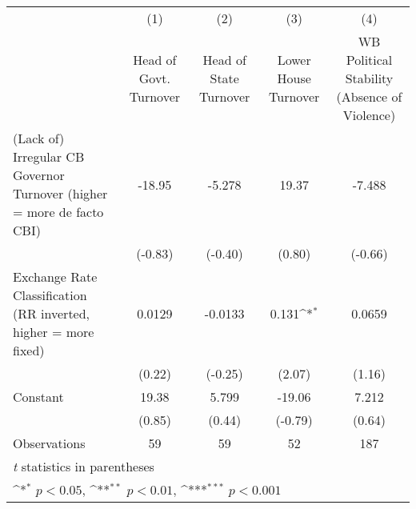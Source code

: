 {
\def\sym#1{\ifmmode^{#1}\else\(^{#1}\)\fi}
\begin{tabular*}{\linewidth}{@{\hskip\tabcolsep\extracolsep\fill}l*{4}{c}}
\hline\hline
                &\multicolumn{1}{c}{(1)}&\multicolumn{1}{c}{(2)}&\multicolumn{1}{c}{(3)}&\multicolumn{1}{c}{(4)}\\
                &\multicolumn{1}{c}{Head of Govt. Turnover}&\multicolumn{1}{c}{Head of State Turnover}&\multicolumn{1}{c}{Lower House Turnover}&\multicolumn{1}{c}{WB Political Stability (Absence of Violence)}\\
\hline
(Lack of) Irregular CB Governor Turnover (higher = more de facto CBI)&   -18.95         &   -5.278         &    19.37         &   -7.488         \\
                &  (-0.83)         &  (-0.40)         &   (0.80)         &  (-0.66)         \\
[1em]
Exchange Rate Classification (RR inverted, higher = more fixed)&   0.0129         &  -0.0133         &    0.131\sym{*}  &   0.0659         \\
                &   (0.22)         &  (-0.25)         &   (2.07)         &   (1.16)         \\
[1em]
Constant        &    19.38         &    5.799         &   -19.06         &    7.212         \\
                &   (0.85)         &   (0.44)         &  (-0.79)         &   (0.64)         \\
\hline
Observations    &       59         &       59         &       52         &      187         \\
\hline\hline
\multicolumn{5}{l}{\footnotesize \textit{t} statistics in parentheses}\\
\multicolumn{5}{l}{\footnotesize \sym{*} \(p<0.05\), \sym{**} \(p<0.01\), \sym{***} \(p<0.001\)}\\
\end{tabular*}
}
